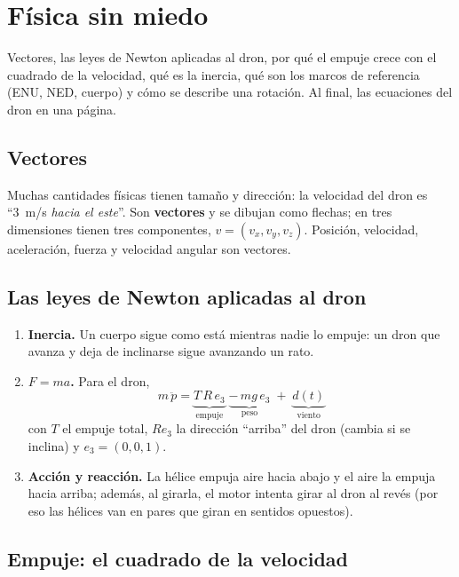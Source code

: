 \chapter{Física sin miedo}

\begin{enpocas}
Vectores, las leyes de Newton aplicadas al dron, por qué el empuje crece con el cuadrado de la
velocidad, qué es la inercia, qué son los marcos de referencia (ENU, NED, cuerpo) y cómo se describe
una rotación. Al final, las ecuaciones del dron en una página.
\end{enpocas}

\section{Vectores}

Muchas cantidades físicas tienen tamaño y dirección: la velocidad del dron es ``3~m/s \emph{hacia el
este}''. Son \textbf{vectores} y se dibujan como flechas; en tres dimensiones tienen tres componentes,
$v = (v_x, v_y, v_z)$. Posición, velocidad, aceleración, fuerza y velocidad angular son vectores.

\section{Las leyes de Newton aplicadas al dron}

\begin{enumerate}
  \item \textbf{Inercia.} Un cuerpo sigue como está mientras nadie lo empuje: un dron que avanza y deja
        de inclinarse sigue avanzando un rato.
  \item \textbf{$F = ma$.} Para el dron,
        \begin{equation}
        m\,\ddot p = \underbrace{T\,R\,e_3}_{\text{empuje}} \;\underbrace{-\,mg\,e_3}_{\text{peso}} \;+\; \underbrace{d(t)}_{\text{viento}}
        \end{equation}
        con $T$ el empuje total, $R e_3$ la dirección ``arriba'' del dron (cambia si se inclina) y
        $e_3=(0,0,1)$.
  \item \textbf{Acción y reacción.} La hélice empuja aire hacia abajo y el aire la empuja hacia arriba;
        además, al girarla, el motor intenta girar al dron al revés (por eso las hélices van en pares que
        giran en sentidos opuestos).
\end{enumerate}

\section{Empuje: el cuadrado de la velocidad}

